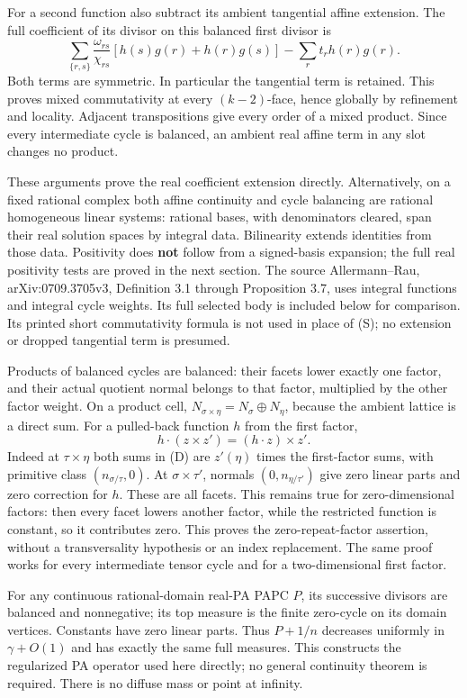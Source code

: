 \documentclass[
  11pt,
]{article}
\begin{document}
For a second function also subtract its ambient tangential affine
extension. The full coefficient of its divisor on this balanced first
divisor is \[
 \sum_{\{r,s\}}\frac{\omega_{rs}}{\chi_{rs}}
                     [h(s)g(r)+h(r)g(s)]
                     -\sum_r t_rh(r)g(r).
 \tag{S}
\] Both terms are symmetric. In particular the tangential term is
retained. This proves mixed commutativity at every \((k-2)\)-face, hence
globally by refinement and locality. Adjacent transpositions give every
order of a mixed product. Since every intermediate cycle is balanced, an
ambient real affine term in any slot changes no product.

These arguments prove the real coefficient extension directly.
Alternatively, on a fixed rational complex both affine continuity and
cycle balancing are rational homogeneous linear systems: rational bases,
with denominators cleared, span their real solution spaces by integral
data. Bilinearity extends identities from those data. Positivity does
\textbf{not} follow from a signed-basis expansion; the full real
positivity tests are proved in the next section. The source
Allermann--Rau, arXiv:0709.3705v3, Definition 3.1 through Proposition
3.7, uses integral functions and integral cycle weights. Its full
selected body is included below for comparison. Its printed short
commutativity formula is not used in place of (S); no extension or
dropped tangential term is presumed.

Products of balanced cycles are balanced: their facets lower exactly one
factor, and their actual quotient normal belongs to that factor,
multiplied by the other factor weight. On a product cell,
\(N_{\sigma\times\eta}=N_\sigma\oplus N_\eta\), because the ambient
lattice is a direct sum. For a pulled-back function \(h\) from the first
factor, \[
             h\cdot(z\times z')=(h\cdot z)\times z'.
 \tag{P}
\] Indeed at \(\tau\times\eta\) both sums in (D) are \(z'(\eta)\) times
the first-factor sums, with primitive class \((n_{\sigma/\tau},0)\). At
\(\sigma\times\tau'\), normals \((0,n_{\eta/\tau'})\) give zero linear
parts and zero correction for \(h\). These are all facets. This remains
true for zero-dimensional factors: then every facet lowers another
factor, while the restricted function is constant, so it contributes
zero. This proves the zero-repeat-factor assertion, without a
transversality hypothesis or an index replacement. The same proof works
for every intermediate tensor cycle and for a two-dimensional first
factor.

For any continuous rational-domain real-PA PAPC \(P\), its successive
divisors are balanced and nonnegative; its top measure is the finite
zero-cycle on its domain vertices. Constants have zero linear parts.
Thus \(P+1/n\) decreases uniformly in \(\gamma+O(1)\) and has exactly
the same full measures. This constructs the regularized PA operator used
here directly; no general continuity theorem is required. There is no
diffuse mass or point at infinity.
\end{document}
